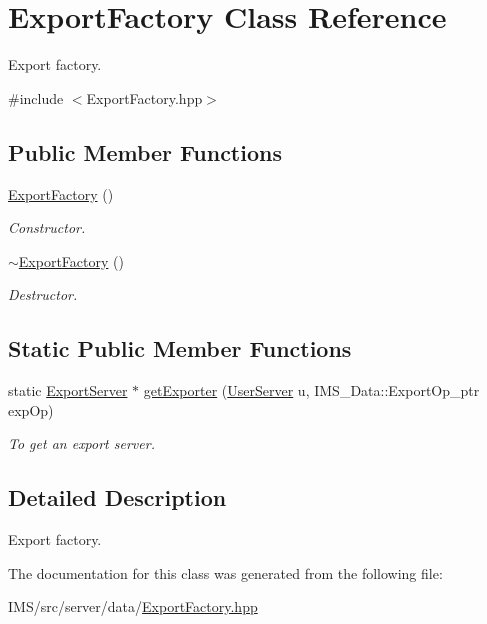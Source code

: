 \hypertarget{classExportFactory}{
\section{ExportFactory Class Reference}
\label{classExportFactory}
}


Export factory.  




{\ttfamily \#include $<$ExportFactory.hpp$>$}

\subsection*{Public Member Functions}
\begin{DoxyCompactItemize}
\item 
\hypertarget{classExportFactory_a77be2ebda05210278b932db24825d93b}{
\hyperlink{classExportFactory_a77be2ebda05210278b932db24825d93b}{ExportFactory} ()}
\label{classExportFactory_a77be2ebda05210278b932db24825d93b}

\begin{DoxyCompactList}\small\item\em Constructor. \item\end{DoxyCompactList}\item 
\hypertarget{classExportFactory_a47fdb6514865683355d99325e127f2f4}{
\hyperlink{classExportFactory_a47fdb6514865683355d99325e127f2f4}{$\sim$ExportFactory} ()}
\label{classExportFactory_a47fdb6514865683355d99325e127f2f4}

\begin{DoxyCompactList}\small\item\em Destructor. \item\end{DoxyCompactList}\end{DoxyCompactItemize}
\subsection*{Static Public Member Functions}
\begin{DoxyCompactItemize}
\item 
\hypertarget{classExportFactory_afd5dc610a6794729ec622d77525442cf}{
static \hyperlink{classExportServer}{ExportServer} $\ast$ \hyperlink{classExportFactory_afd5dc610a6794729ec622d77525442cf}{getExporter} (\hyperlink{classUserServer}{UserServer} u, IMS\_\-Data::ExportOp\_\-ptr expOp)}
\label{classExportFactory_afd5dc610a6794729ec622d77525442cf}

\begin{DoxyCompactList}\small\item\em To get an export server. \item\end{DoxyCompactList}\end{DoxyCompactItemize}


\subsection{Detailed Description}
Export factory. 

The documentation for this class was generated from the following file:\begin{DoxyCompactItemize}
\item 
IMS/src/server/data/\hyperlink{ExportFactory_8hpp}{ExportFactory.hpp}\end{DoxyCompactItemize}
